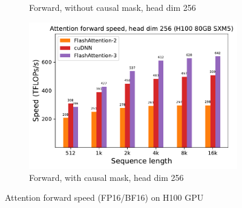 \begin{figure}[!ht]
\begin{subfigure}{.5\textwidth}
    \caption{Forward, without causal mask, head dim 256}
  \end{subfigure}%
  \begin{subfigure}{.5\textwidth}
    \centering
    \includegraphics[width=.95\linewidth]{figs/flash3_h100_causal_True_hdim_256_fwd_speed.pdf}
    \caption{Forward, with causal mask, head dim 256}
  \end{subfigure}
  \caption{Attention forward speed (FP16/BF16) on H100 GPU}
  \label{fig:benchmark_attn_fwd}
\end{figure}

